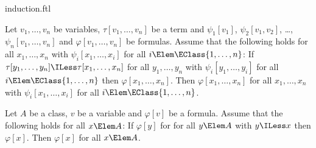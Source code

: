 \documentclass{stex}
\begin{document}
\begin{smodule}{induction.ftl}


\begin{fakeforthel}
  \begin{axiom}
    Let $v_1,\dots,v_n$ be variables, $\tau[v_1,\dots,v_n]$ be a term and
    $\psi_1[v_1]$, $\psi_2[v_1,v_2]$, \dots, $\psi_n[v_1,\dots,v_n]$ and $\varphi[v_1,\dots,v_n]$ be formulas.
    Assume that the following holds for all $x_1,\dots,x_n$ with $\psi_i[x_1,\dots,x_i]$ for all $i \Elem \EClass{1,\dots,n}$:
    If $\tau[y_1,\dots,y_n] \ILess \tau[x_1,\dots,x_n]$
    for all $y_1,\dots,y_n$ with $\psi_i[y_1,\dots,y_i]$ for all $i \Elem \EClass{1,\dots,n}$
    then $\varphi[x_1,\dots,x_n]$.
    Then $\varphi[x_1,\dots,x_n]$ for all $x_1,\dots,x_n$ with $\psi_i[x_1,\dots,x_i]$ for all $i \Elem \EClass{1,\dots,n}$.
  \end{axiom}
\end{fakeforthel}

\begin{fakeforthel}
  \begin{corollary}
    Let $A$ be a class, $v$ be a variable and $\varphi[v]$ be a formula.
    Assume that the following holds for all $x \Elem A$:
    If $\varphi[y]$ for for all $y \Elem A$ with $y \ILess x$ then $\varphi[x]$.
    Then $\varphi[x]$ for all $x \Elem A$.
  \end{corollary}
\end{fakeforthel}

\end{smodule}
\end{document}
